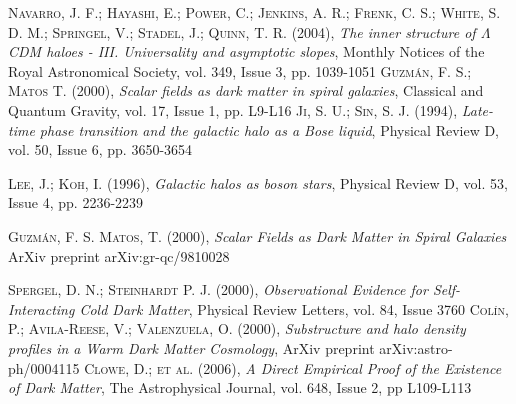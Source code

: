 \documentclass[a4paper,openright,12pt]{book}
\begin{document}
\begin{thebibliography}{a}
 \textsc{Navarro, J. F.; Hayashi, E.; Power, C.; Jenkins, A. R.; Frenk, C. S.; White, S. D. M.; Springel, V.; Stadel, J.; Quinn, T. R. (2004)}, 
\textit{The inner structure of $\Lambda$CDM haloes - III. Universality and asymptotic slopes}, 
Monthly Notices of the Royal Astronomical Society, vol. 349, Issue 3, pp. 1039-1051
 \textsc{Guzmán, F. S.; Matos T. (2000)}, 
\textit{Scalar fields as dark matter in spiral galaxies},
Classical and Quantum Gravity, vol. 17, Issue 1, pp. L9-L16 
 \textsc{Ji, S. U.; Sin, S. J. (1994)},
\textit{Late-time phase transition and the galactic halo as a Bose liquid},
Physical Review D, vol. 50, Issue 6, pp. 3650-3654 

 \textsc{Lee, J.; Koh, I. (1996)},
\textit{Galactic halos as boson stars},
Physical Review D, vol. 53, Issue 4, pp. 2236-2239

 \textsc{Guzmán, F. S. Matos, T. (2000)},
\textit{Scalar Fields as Dark Matter in Spiral Galaxies}
ArXiv preprint arXiv:gr-qc/9810028

 \textsc{Spergel, D. N.; Steinhardt P. J. (2000)},
\textit{Observational Evidence for Self-Interacting Cold Dark Matter},
Physical Review Letters, vol. 84, Issue 3760
 \textsc{Colín, P.; Avila-Reese, V.; Valenzuela, O. (2000)},
\textit{Substructure and halo density profiles in a Warm Dark Matter Cosmology},
ArXiv preprint arXiv:astro-ph/0004115
 \textsc{Clowe, D.; et al. (2006)},
\textit{A Direct Empirical Proof of the Existence of Dark Matter},
The Astrophysical Journal, vol. 648, Issue 2, pp L109-L113
 

\end{thebibliography}
\end{document}

